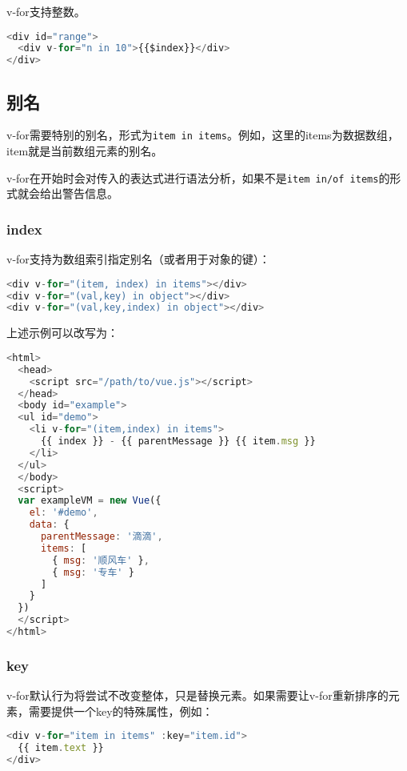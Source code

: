 v-for支持整数。


\begin{lstlisting}[language=JavaScript]
<div id="range">
  <div v-for="n in 10">{{$index}}</div>
</div>
\end{lstlisting}

\subsection{别名}

v-for需要特别的别名，形式为\texttt{item in items}。例如，这里的items为数据数组，item就是当前数组元素的别名。

v-for在开始时会对传入的表达式进行语法分析，如果不是\texttt{item in/of items}的形式就会给出警告信息。


\subsubsection{index}



v-for支持为数组索引指定别名（或者用于对象的键）：



\begin{lstlisting}[language=JavaScript]
<div v-for="(item, index) in items"></div>
<div v-for="(val,key) in object"></div>
<div v-for="(val,key,index) in object"></div>
\end{lstlisting}

上述示例可以改写为：


\begin{lstlisting}[language=JavaScript]
<html>
  <head>
    <script src="/path/to/vue.js"></script>
  </head>
  <body id="example">
  <ul id="demo">
    <li v-for="(item,index) in items">
      {{ index }} - {{ parentMessage }} {{ item.msg }}
    </li>
  </ul>
  </body>
  <script>
  var exampleVM = new Vue({
    el: '#demo',
    data: {
      parentMessage: '滴滴',
      items: [
        { msg: '顺风车' },
        { msg: '专车' }
      ]
    }
  })
  </script>
</html>
\end{lstlisting}

\subsubsection{key}


v-for默认行为将尝试不改变整体，只是替换元素。如果需要让v-for重新排序的元素，需要提供一个key的特殊属性，例如：


\begin{lstlisting}[language=JavaScript]
<div v-for="item in items" :key="item.id">
  {{ item.text }}
</div>
\end{lstlisting}



